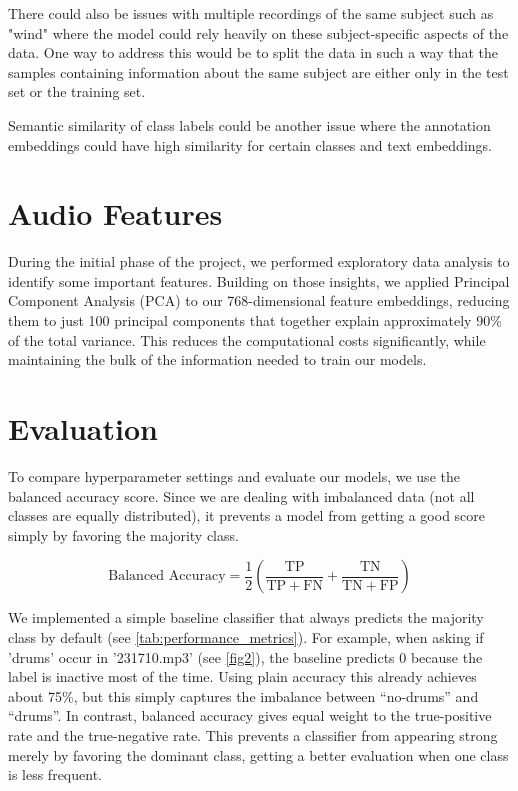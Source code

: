 \documentclass{article}
\begin{document}
There could also be issues with multiple recordings of the same subject such as "wind" where the model could rely heavily on these subject-specific aspects of the data. One way to address this would be to split the data in such a way that the samples containing information about the same subject are either only in the test set or the training set. 

Semantic similarity of class labels could be another issue where the annotation embeddings could have high similarity for certain classes and text embeddings. 



\section{Audio Features}
\label{sec:audio_features}
During the initial phase of the project, we performed exploratory data analysis to identify some important features. Building on those insights, we applied Principal Component Analysis (PCA) to our 768-dimensional feature embeddings, reducing them to just 100 principal components that together explain approximately 90\% of the total variance. This reduces the computational costs significantly, while maintaining the bulk of the information needed to train our models.

\section{Evaluation}
\label{sec:evaluation}
To compare hyperparameter settings and evaluate our models, we use the balanced accuracy score. Since we are dealing with imbalanced data (not all classes are equally distributed), it prevents a model from getting a good score simply by favoring the majority class. 

\begin{equation}
\text{Balanced Accuracy} = \frac{1}{2} \left( \frac{\mathrm{TP}}{\mathrm{TP} + \mathrm{FN}} + \frac{\mathrm{TN}}{\mathrm{TN} + \mathrm{FP}} \right)
\end{equation}

\vspace{0.3cm}

We implemented a simple baseline classifier that always predicts the majority class by default (see \autoref{tab:performance_metrics}). For example, when asking if 'drums' occur in '231710.mp3' (see \autoref{fig2}), the baseline predicts 0 because the label is inactive most of the time. Using plain accuracy this already achieves about 75\%, but this simply captures the imbalance between “no-drums” and “drums”. In contrast, balanced accuracy gives equal weight to the true-positive rate and the true-negative rate. This prevents a classifier from appearing strong merely by favoring the dominant class, getting a better evaluation when one class is less frequent.
\end{document}

